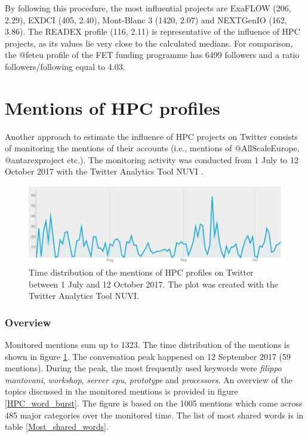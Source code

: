 By following this procedure, the most influential projects are ExaFLOW (206, 2.29), EXDCI (405, 2.40), Mont-Blanc 3 (1420, 2.07) and NEXTGenIO (162, 3.86). The READEX profile (116, 2.11) is representative of the influence of HPC projects, as its values lie very close to the calculated medians. For comparison, the @fet\textunderscore eu profile of the FET funding programme has 6499 followers and a ratio followers/following equal to 4.03.

\section{Mentions of HPC profiles} \label{Mentions_of_HPC_profiles} 
Another approach to estimate the influence of HPC projects on Twitter consists of monitoring the mentions of their accounts (i.e., mentions of @AllScaleEurope, @antarex\textunderscore project etc.). The monitoring activity was conducted from 1 July to 12 October 2017 with the Twitter Analytics Tool NUVI \cite{NUVI}.  

\begin{figure}[!t] 
 \begin{center}
 \includegraphics[scale=0.45]{Images/NUVI_time_distribution.png}
 \caption{Time distribution of the mentions of HPC profiles on Twitter between 1 July and 12 October 2017. The plot was created with the Twitter Analytics Tool NUVI.}
 \label{NUVI_time_distribution}
 \end{center}
\end{figure}

\subsubsection{Overview}
Monitored mentions sum up to 1323. The time distribution of the mentions is shown in figure \ref{NUVI_time_distribution}. The conversation peak happened on 12 September 2017 (59 mentions). During the peak, the most frequently used keywords were \textit{filippo mantovani}, \textit{workshop}, \textit{server cpu}, \textit{prototype} and \textit{processors}. An overview of the topics discussed in the monitored mentions is provided in figure \ref{HPC_word_burst}. The figure is based on the 1005 mentions which came across 485 major categories over the monitored time. The list of most shared words is in table \ref{Most_shared_words}.

